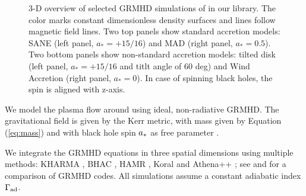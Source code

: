 \begin{figure}
  \caption{3-D overview of selected GRMHD simulations of \sgra in our library. The color marks constant dimensionless density surfaces and lines follow magnetic field lines. Two top panels show standard accretion models: SANE (left panel, $a_*=+15/16$) and MAD (right panel, $a_*=0.5$). Two bottom panels show non-standard accretion models: tilted disk (left panel, $a_*=+15/16$ and titlt angle of 60 deg) and Wind Accretion (right panel, $a_*=0$). In case of spinning black holes, the spin is aligned with z-axis. 
    }
  \label{fig:GRMHD}
\end{figure}

We model the plasma flow around \sgra using ideal, non-radiative GRMHD.  The gravitational field is given by the Kerr metric, with mass given by Equation (\ref{eq:mass}) and with black hole spin $a_*$ as free parameter \citep[see e.g.,][]{2003ApJ...589..444G, 2005ApJ...635..723A, 2007A&A...473...11D}.

We integrate the GRMHD equations in three spatial dimensions using multiple methods: {KHARMA} \citep{2021JOSS....6.3336P}, BHAC \citep{2017ComAC...4....1P}, HAMR \citep{2018MNRAS.474L..81L}, Koral \citep{2013MNRAS.429.3533S} and Athena++ \citep{2016ApJS..225...22W}; see \citealt{2019ApJS..243...26P} and \citet[in prep]{Olivares_et_al} for a comparison of GRMHD codes.  All simulations assume a constant adiabatic index $\Gamma_{\rm ad}$.


